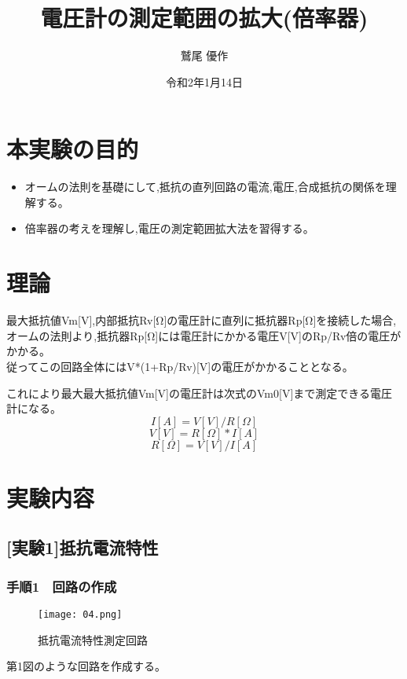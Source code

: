 \documentclass[titlepage]{jarticle}
\title{電圧計の測定範囲の拡大(倍率器)}
\author{鷲尾 優作}
\date{令和2年1月14日}
\begin{document}
\maketitle

\section{本実験の目的}
\begin{itemize}
    \item オームの法則を基礎にして,抵抗の直列回路の電流,電圧,合成抵抗の関係を理解する。
    \item 倍率器の考えを理解し,電圧の測定範囲拡大法を習得する。
\end{itemize}

\section{理論}
最大抵抗値Vm[V],内部抵抗Rv[Ω]の電圧計に直列に抵抗器Rp[Ω]を接続した場合,\\
オームの法則より,抵抗器Rp[Ω]には電圧計にかかる電圧V[V]のRp/Rv倍の電圧がかかる。\\
従ってこの回路全体にはV*(1+Rp/Rv)[V]の電圧がかかることとなる。

これにより最大最大抵抗値Vm[V]の電圧計は次式のVm0[V]まで測定できる電圧計になる。
\begin{equation}
    I[A]=V[V]/R[Ω]
\end{equation}
\begin{equation}
    V[V]=R[Ω]*I[A]
\end{equation}
\begin{equation}
    R[Ω]=V[V]/I[A]
\end{equation}

\section{実験内容}
\subsection{[実験1]抵抗電流特性}
\subsubsection{手順1　回路の作成}
\begin{figure}[H]
    \begin{center}
        \texttt{[image: 04.png]}
        \caption{抵抗電流特性測定回路}
    \end{center}
\end{figure}
第1図のような回路を作成する。
\end{document}
